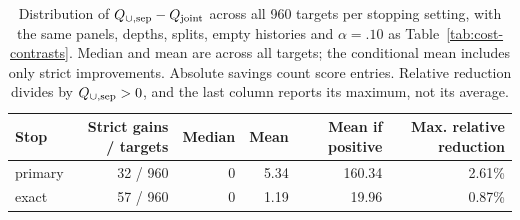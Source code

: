 \begin{table}[t]
\centering\small
\begin{tabular}{lrrrrr}
\toprule
Stop & Strict gains / targets & Median & Mean & Mean if positive & Max. relative reduction \\
\midrule
primary & 32 / 960 & 0 & 5.34 & 160.34 & 2.61\% \\
exact & 57 / 960 & 0 & 1.19 & 19.96 & 0.87\% \\
\bottomrule
\end{tabular}
\caption{Distribution of $Q_{\cup,\rm sep}-Q_{\rm joint}$ across all 960 targets per stopping setting, with the same panels, depths, splits, empty histories and $\alpha=.10$ as Table~\ref{tab:cost-contrasts}. Median and mean are across all targets; the conditional mean includes only strict improvements. Absolute savings count score entries. Relative reduction divides by $Q_{\cup,\rm sep}>0$, and the last column reports its maximum, not its average.}
\label{tab:gain-distribution}
\end{table}
